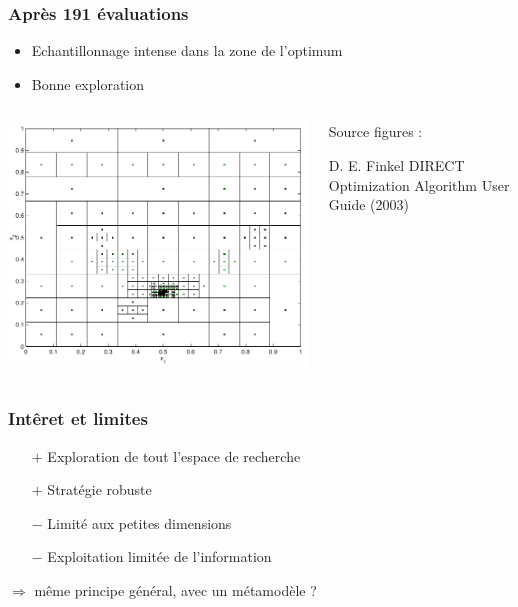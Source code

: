 \documentclass{beamer}
\begin{document}
\begin{frame}
\frametitle{Après 191 évaluations}
\begin{itemize}
 \item Echantillonnage intense dans la zone de l'optimum
 \item Bonne exploration 
\end{itemize}



\begin{columns}
 \begin{column}{80mm}
 \includegraphics[width=\textwidth]{fig/direct3.png}  
 \end{column}
 \begin{column}{40mm}
   \scriptsize{Source figures :
 \begin{thebibliography}{1}
\beamertemplatearticlebibitems
     D. E. Finkel
         \newblock DIRECT Optimization Algorithm User Guide (2003)
 \end{thebibliography}}
 \end{column}
\end{columns}
\end{frame}
\begin{frame}
\frametitle{Intêret et limites}
\begin{itemize}
 \item[$+$] Exploration de tout l'espace de recherche
 \item[$+$] Stratégie robuste
 \item[$-$] Limité aux petites dimensions
 \item[$-$] Exploitation limitée de l'information
\end{itemize}
\vspace{5mm}
$\Rightarrow$ même principe général, avec un métamodèle ?
\end{frame}
\end{document}
